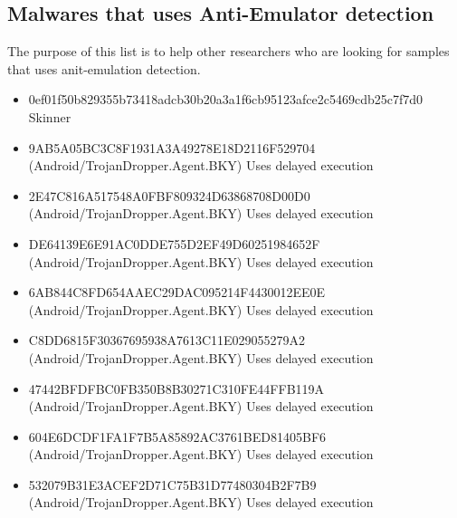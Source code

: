 \documentclass[../main.tex]{subfile}
\begin{document}
\begin{appendices}
	\chapter{Malwares that uses Anti-Emulator detection}
	The purpose of this list is to help other researchers who are looking for samples that uses anit-emulation detection.
	\begin{itemize}
		\item 0ef01f50b829355b73418adcb30b20a3a1f6cb95123afce2c5469cdb25c7f7d0 Skinner
		\item 9AB5A05BC3C8F1931A3A49278E18D2116F529704 (Android/TrojanDropper.Agent.BKY) Uses delayed execution \cite{eset_multi_stage_malware}
		\item 2E47C816A517548A0FBF809324D63868708D00D0 (Android/TrojanDropper.Agent.BKY) Uses delayed execution \cite{eset_multi_stage_malware}
		\item DE64139E6E91AC0DDE755D2EF49D60251984652F (Android/TrojanDropper.Agent.BKY) Uses delayed execution \cite{eset_multi_stage_malware}
		\item 6AB844C8FD654AAEC29DAC095214F4430012EE0E (Android/TrojanDropper.Agent.BKY) Uses delayed execution \cite{eset_multi_stage_malware}
		\item C8DD6815F30367695938A7613C11E029055279A2 (Android/TrojanDropper.Agent.BKY) Uses delayed execution \cite{eset_multi_stage_malware}
		\item 47442BFDFBC0FB350B8B30271C310FE44FFB119A (Android/TrojanDropper.Agent.BKY) Uses delayed execution \cite{eset_multi_stage_malware}
		\item 604E6DCDF1FA1F7B5A85892AC3761BED81405BF6 (Android/TrojanDropper.Agent.BKY) Uses delayed execution \cite{eset_multi_stage_malware}
		\item 532079B31E3ACEF2D71C75B31D77480304B2F7B9 (Android/TrojanDropper.Agent.BKY) Uses delayed execution \cite{eset_multi_stage_malware}
	\end{itemize}
\end{appendices}
\end{document}
